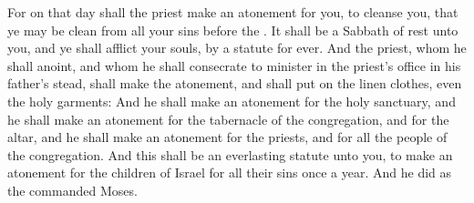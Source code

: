 \begin{biblechapter}
\verse For on that day shall the priest make an atonement for you, to cleanse you, that ye may be clean from all your sins before the \LORD.
\verse It shall be a Sabbath of rest unto you, and ye shall afflict your souls, by a statute for ever.
\verse And the priest, whom he shall anoint, and whom he shall consecrate to minister in the priest's office in his father's stead, shall make the atonement, and shall put on the linen clothes, even the holy garments:
\verse And he shall make an atonement for the holy sanctuary, and he shall make an atonement for the tabernacle of the congregation, and for the altar, and he shall make an atonement for the priests, and for all the people of the congregation.
\verse And this shall be an everlasting statute unto you, to make an atonement for the children of Israel for all their sins once a year. And he did as the \LORD commanded Moses.
\end{biblechapter}

